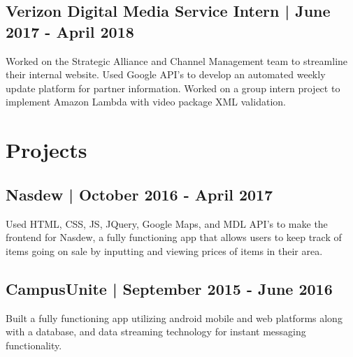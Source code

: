 \documentclass[12]{article}
\begin{document}
\subsection{Verizon Digital Media Service Intern | June 2017 - April 2018}
Worked on the Strategic Alliance and Channel Management team to streamline their internal website. Used Google API’s to develop an automated weekly update platform for partner information. Worked on a group intern project to implement Amazon Lambda with video package XML validation.
\section{Projects}
\subsection{Nasdew | October 2016 - April 2017}
Used HTML, CSS, JS, JQuery, Google Maps, and MDL API’s to make the frontend for Nasdew, a fully functioning app that allows users to keep track of items going on sale by inputting and viewing prices of items in their area.
\subsection{CampusUnite | September 2015 - June 2016}
Built a fully functioning app utilizing android mobile and web platforms along with a database, and data streaming technology for instant messaging functionality.
\end{document}
